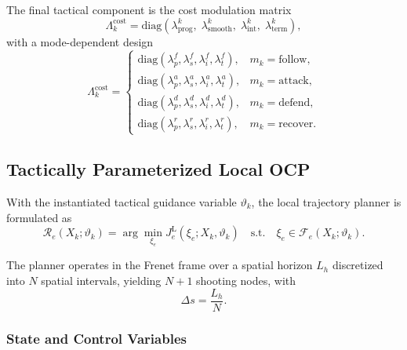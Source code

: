\documentclass[final ,3p, times]{elsarticle}
\begin{document}
The final tactical component is the cost modulation matrix
\begin{equation}
\Lambda_k^{\mathrm{cost}}
=
\mathrm{diag}
\left(
\lambda_{\mathrm{prog}}^k,\;
\lambda_{\mathrm{smooth}}^k,\;
\lambda_{\mathrm{int}}^k,\;
\lambda_{\mathrm{term}}^k
\right),
\label{eq:cost_modulation_matrix_instantiated}
\end{equation}
with a mode-dependent design
\begin{equation}
\Lambda_k^{\mathrm{cost}}
=
\begin{cases}
\mathrm{diag}(\lambda_p^f,\lambda_s^f,\lambda_i^f,\lambda_t^f), & m_k=\mathrm{follow},\\
\mathrm{diag}(\lambda_p^a,\lambda_s^a,\lambda_i^a,\lambda_t^a), & m_k=\mathrm{attack},\\
\mathrm{diag}(\lambda_p^d,\lambda_s^d,\lambda_i^d,\lambda_t^d), & m_k=\mathrm{defend},\\
\mathrm{diag}(\lambda_p^r,\lambda_s^r,\lambda_i^r,\lambda_t^r), & m_k=\mathrm{recover}.
\end{cases}
\label{eq:cost_modulation_modes}
\end{equation}

\subsection{Tactically Parameterized Local OCP}
\label{subsec:tactically_parameterized_ocp_detail}

With the instantiated tactical guidance variable $\vartheta_k$, the local trajectory planner is formulated as
\begin{equation}
\mathcal{R}_e(X_k;\vartheta_k)
=
\arg\min_{\xi_e}
J_e^{\mathrm{L}}(\xi_e;X_k,\vartheta_k)
\quad
\text{s.t.}
\quad
\xi_e \in \mathcal{F}_e(X_k;\vartheta_k).
\label{eq:tactical_ocp_repeated}
\end{equation}

The planner operates in the Frenet frame over a spatial horizon $L_h$ discretized into $N$ spatial intervals, yielding $N+1$ shooting nodes, with
\begin{equation}
\Delta s = \frac{L_h}{N}.
\label{eq:planner_spatial_step}
\end{equation}

\subsubsection{State and Control Variables}
\end{document}
